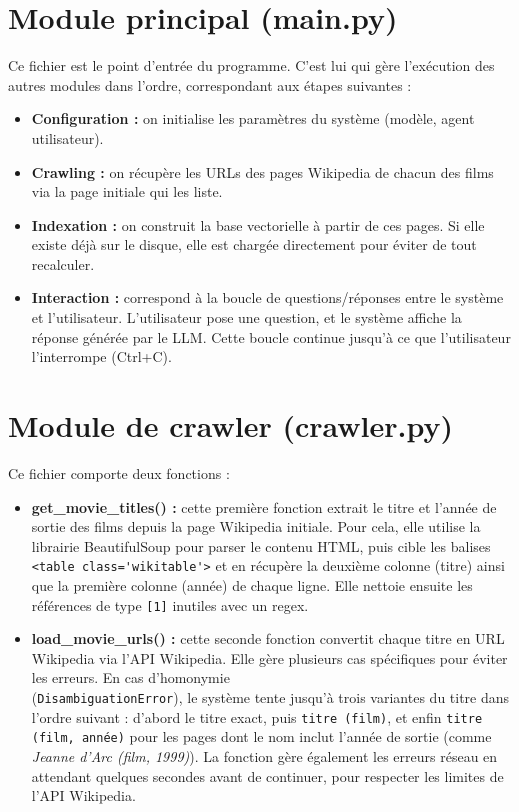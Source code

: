 \documentclass[11pt]{report}
\begin{document}
    \section{Module principal (main.py)}
 
    Ce fichier est le point d'entrée du programme. C'est lui qui gère l'exécution des autres modules dans l'ordre, correspondant aux étapes suivantes :
 
    \begin{itemize}
        \item \textbf{Configuration :} on initialise les paramètres du système (modèle, agent utilisateur).
        \item \textbf{Crawling :} on récupère les URLs des pages Wikipedia de chacun des films via la page initiale qui les liste.
        \item \textbf{Indexation :} on construit la base vectorielle à partir de ces pages. Si elle existe déjà sur le disque, elle est chargée directement pour éviter de tout recalculer.
        \item \textbf{Interaction :} correspond à la boucle de questions/réponses entre le système et l'utilisateur. L'utilisateur pose une question, et le système affiche la réponse générée par le LLM. Cette boucle continue jusqu'à ce que l'utilisateur l'interrompe (Ctrl+C).
    \end{itemize}
 
    \section{Module de crawler (crawler.py)}
 
    Ce fichier comporte deux fonctions :
 
    \begin{itemize}
        \item \textbf{get\_movie\_titles() :} cette première fonction extrait le titre et l'année de sortie des films depuis la page Wikipedia initiale. Pour cela, elle utilise la librairie BeautifulSoup pour parser le contenu HTML, puis cible les balises \verb|<table class='wikitable'>| et en récupère la deuxième colonne (titre) ainsi que la première colonne (année) de chaque ligne. Elle nettoie ensuite les références de type \texttt{[1]} inutiles avec un regex.

        \item \textbf{load\_movie\_urls() :} cette seconde fonction convertit chaque titre en URL Wikipedia via l'API Wikipedia. Elle gère plusieurs cas spécifiques pour éviter les erreurs. En cas d'homonymie \\ (\texttt{DisambiguationError}), le système tente jusqu'à trois variantes du titre dans l'ordre suivant : d'abord le titre exact, puis \texttt{titre (film)}, et enfin \texttt{titre (film, année)} pour les pages dont le nom inclut l'année de sortie (comme \textit{Jeanne d'Arc (film, 1999)}). La fonction gère également les erreurs réseau en attendant quelques secondes avant de continuer, pour respecter les limites de l'API Wikipedia.
    \end{itemize}
 
\end{document}

